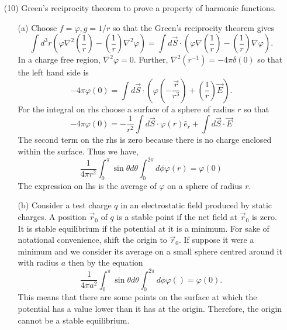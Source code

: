 \documentclass{article}
\newcommand{\uv}[1]{\hat{e}_{#1}}
\newcommand{\grad}[1]{\nabla{#1}}
\begin{document}
\begin{enumerate}
\item[(10)] Green's reciprocity theorem to prove a property of harmonic functions.
\begin{enumerate}
\item[(a)] Choose $f = \varphi, g = 1/r$ so that the Green's reciprocity theorem gives
\[
\int d^3 r\left(\varphi\nabla^2\left(\frac{1}{r}\right) - \left(\frac{1}{r}\right)\nabla^2\varphi\right)
= \int d\vec{S}\cdot\left(\varphi\grad{\left(\frac{1}{r}\right)} - \left(\frac{1}{r}\right)\grad\varphi\right).
\]
In a charge free region, $\nabla^2\varphi = 0$. Further, $\nabla^2(r^{-1}) = 
-4\pi\delta(0)$ so that the left hand side is
\[
-4\pi\varphi(0) = \int d\vec{S}\cdot\left(\varphi\left(-\frac{\vec{r}}{r^3}\right) +
\left(\frac{1}{r}\right)\vec{E}\right).
\]
For the integral on rhs choose a surface of a sphere of radius $r$ so that
\[
-4\pi\varphi(0) = -\frac{1}{r^2}\int d\vec{S}\cdot\varphi(r)\uv{r} +
\int d\vec{S}\cdot\vec{E}
\]
The second term on the rhs is zero because there is no charge enclosed within the
surface. Thus we have,
\[
\frac{1}{4\pi r^2}\int_0^\pi \sin\theta d\theta\int_0^{2\pi}d\phi\varphi(r) = \varphi(0)
\]
The expression on lhs is the average of $\varphi$ on a sphere of radius $r$.

\item[(b)] Consider a test charge $q$ in an electrostatic field produced by static
charges. A position $\vec{r}_0$ of $q$ is a stable point if the net field at $\vec{r}_0$
is zero. It is stable equilibrium if the potential at it is a minimum. For sake of
notational convenience, shift the origin to $\vec{r}_0$. If suppose it were a minimum 
and we consider its average on a small sphere centred around it with radius $a$ then
by the equation
\[
\frac{1}{4\pi a^2}\int_0^\pi \sin\theta d\theta\int_0^{2\pi}d\phi\varphi() = \varphi(0).
\]
This means that there are some points on the surface at which the potential has
a value lower than it has at the origin. Therefore, the origin cannot be a stable
equilibrium.
\end{enumerate}
\end{enumerate}
\end{document}
